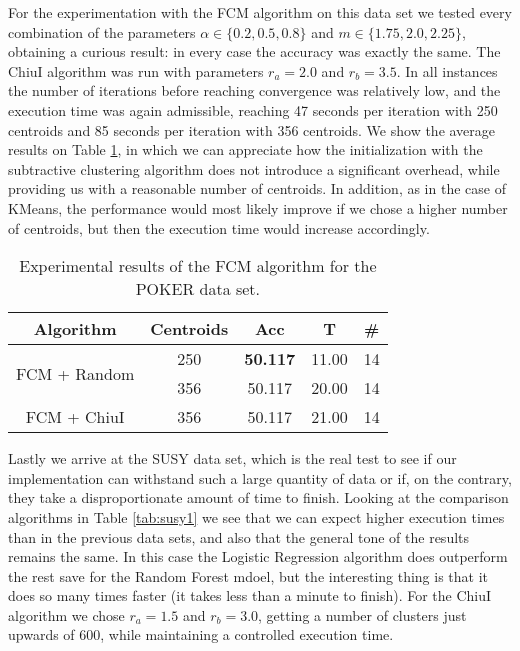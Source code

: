For the experimentation with the FCM algorithm on this data set we tested every combination of the parameters $\alpha \in \{0.2,0.5,0.8\}$ and $m \in \{1.75,2.0,2.25\}$, obtaining a curious result: in every case the accuracy was exactly the same. The ChiuI algorithm was run with parameters $r_a=2.0$ and $r_b=3.5$. In all instances the number of iterations before reaching convergence was relatively low, and the execution time was again admissible, reaching 47 seconds per iteration with 250 centroids and 85 seconds per iteration with 356 centroids. We show the average results on Table \ref{tab:poker2}, in which we can appreciate how the initialization with the subtractive clustering algorithm does not introduce a significant overhead, while providing us with a reasonable number of centroids. In addition, as in the case of KMeans, the performance would most likely improve if we chose a higher number of centroids, but then the execution time would increase accordingly.

\begin{table}[h!]
\centering
\caption{Experimental results of the FCM algorithm for the POKER data set.}
\label{tab:poker2}
\begin{tabular}{ccccc}
\toprule
Algorithm & Centroids & Acc & T & \#\\ \midrule
\multirow{2}{*}{FCM + Random} &250 & \textbf{50.117} & 11.00 & 14\\
 & 356 & 50.117 & 20.00 & 14\\
FCM + ChiuI & 356 & 50.117 & 21.00 & 14\\ \bottomrule
\end{tabular}
\end{table}

Lastly we arrive at the SUSY data set, which is the real test to see if our implementation can withstand such a large quantity of data or if, on the contrary, they take a disproportionate amount of time to finish. Looking at the comparison algorithms in Table \ref{tab:susy1} we see that we can expect higher execution times than in the previous data sets, and also that the general tone of the results remains the same. In this case the Logistic Regression algorithm does outperform the rest save for the Random Forest mdoel, but the interesting thing is that it does so many times faster (it takes less than a minute to finish). For the ChiuI algorithm we chose $r_a=1.5$ and $r_b=3.0$, getting a number of clusters just upwards of 600, while maintaining a controlled execution time.

